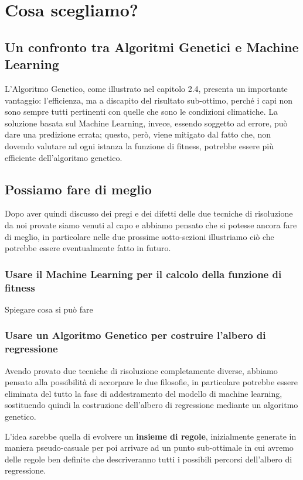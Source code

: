 \documentclass[a4paper, 11pt, oneside]{report}
\begin{document}
        \chapter{Cosa scegliamo?}
            \section{Un confronto tra Algoritmi Genetici e Machine Learning}
                L'Algoritmo Genetico, come illustrato nel capitolo 2.4, presenta un importante vantaggio: l'efficienza,
                ma a discapito del risultato sub-ottimo, perché i capi non sono sempre tutti pertinenti con quelle che
                sono le condizioni climatiche. La soluzione basata sul Machine Learning, invece, essendo soggetto ad
                errore, può dare una predizione errata; questo, però, viene mitigato dal fatto che, non dovendo valutare
                ad ogni istanza la funzione di fitness, potrebbe essere più efficiente dell'algoritmo genetico.
            \section{Possiamo fare di meglio}
                Dopo aver quindi discusso dei pregi e dei difetti delle due tecniche di risoluzione da noi provate siamo
                venuti al capo e abbiamo pensato che si potesse ancora fare di meglio, in particolare nelle due prossime
                sotto-sezioni illustriamo ciò che potrebbe essere eventualmente fatto in futuro.
                \subsection{Usare il Machine Learning per il calcolo della funzione di fitness}
                Spiegare cosa si può fare
                \subsection{Usare un Algoritmo Genetico per costruire l'albero di regressione}
                Avendo provato due tecniche di risoluzione completamente diverse, abbiamo pensato alla possibilità di
                accorpare le due filosofie, in particolare potrebbe essere eliminata del tutto la fase di addestramento
                del modello di machine learning, sostituendo quindi la costruzione dell'albero di regressione mediante un
                algoritmo genetico.
                \par \noindent L'idea sarebbe quella di evolvere un \textbf{insieme di regole}, inizialmente
                generate in maniera pseudo-casuale per poi arrivare ad un punto sub-ottimale in cui avremo delle regole
                ben definite che descriveranno tutti i possibili percorsi dell'albero di regressione.
\end{document}
